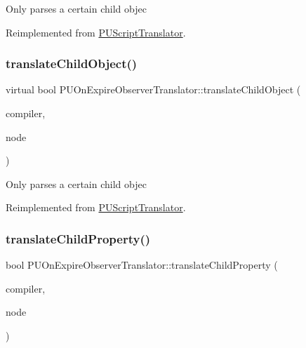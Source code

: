 Only parses a certain child objec 

Reimplemented from \hyperlink{classPUScriptTranslator_ab587d01348ae3e678cb700c719b2b113}{P\+U\+Script\+Translator}.

\mbox{\label{classPUOnExpireObserverTranslator_a5f14260b1fa1af6eea3a77904cec71f1}} 
\subsubsection{\texorpdfstring{translate\+Child\+Object()}{translateChildObject()}\hspace{0.1cm}{\footnotesize\ttfamily [2/2]}}
{\footnotesize\ttfamily virtual bool P\+U\+On\+Expire\+Observer\+Translator\+::translate\+Child\+Object (\begin{DoxyParamCaption}\item[{\hyperlink{classPUScriptCompiler}{P\+U\+Script\+Compiler} $\ast$}]{compiler,  }\item[{\hyperlink{classPUAbstractNode}{P\+U\+Abstract\+Node} $\ast$}]{node }\end{DoxyParamCaption})\hspace{0.3cm}{\ttfamily [virtual]}}

Only parses a certain child objec 

Reimplemented from \hyperlink{classPUScriptTranslator_ab587d01348ae3e678cb700c719b2b113}{P\+U\+Script\+Translator}.

\mbox{\label{classPUOnExpireObserverTranslator_a5c9aebce494bfb736157931378f244a3}} 
\subsubsection{\texorpdfstring{translate\+Child\+Property()}{translateChildProperty()}\hspace{0.1cm}{\footnotesize\ttfamily [1/2]}}
{\footnotesize\ttfamily bool P\+U\+On\+Expire\+Observer\+Translator\+::translate\+Child\+Property (\begin{DoxyParamCaption}\item[{\hyperlink{classPUScriptCompiler}{P\+U\+Script\+Compiler} $\ast$}]{compiler,  }\item[{\hyperlink{classPUAbstractNode}{P\+U\+Abstract\+Node} $\ast$}]{node }\end{DoxyParamCaption})\hspace{0.3cm}{\ttfamily [virtual]}}

